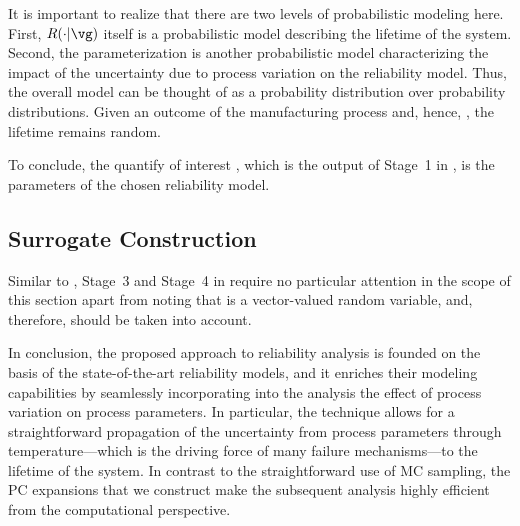 \begin{remark} 
It is important to realize that there are two levels of probabilistic modeling
here. First, $R(\cdot | \vg)$ itself is a probabilistic model describing the
lifetime of the system. Second, the parameterization \vg is another
probabilistic model characterizing the impact of the uncertainty due to process
variation on the reliability model. Thus, the overall model can be thought of as
a probability distribution over probability distributions. Given an outcome of
the manufacturing process and, hence, \vg, the lifetime remains random.
\end{remark}

To conclude, the quantify of interest \g, which is the output of Stage~1 in
, is the parameters \vg of the chosen reliability model.

\subsection{Surrogate Construction}

Similar to , Stage~3 and Stage~4 in
 require no particular attention in the scope of this
section apart from noting that \vq is a vector-valued random variable, and,
therefore,  should be taken into account.

In conclusion, the proposed approach to reliability analysis is founded on the
basis of the state-of-the-art reliability models, and it enriches their modeling
capabilities by seamlessly incorporating into the analysis the effect of process
variation on process parameters. In particular, the technique allows for a
straightforward propagation of the uncertainty from process parameters through
temperature---which is the driving force of many failure mechanisms---to the
lifetime of the system. In contrast to the straightforward use of \ac{MC}
sampling, the \ac{PC} expansions that we construct make the subsequent analysis
highly efficient from the computational perspective.
